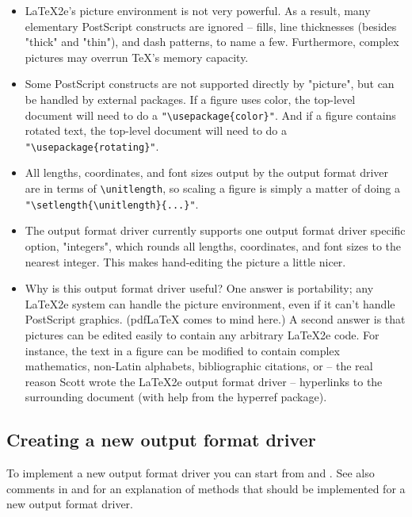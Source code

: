 \documentclass[english,a4paper]{article}
\begin{document}
    \begin{itemize}
   \item LaTeX2e's picture environment is not very powerful.  As a result, many
     elementary PostScript constructs are ignored -- fills, line
     thicknesses (besides "thick" and "thin"), and dash patterns, to name a
     few.  Furthermore, complex pictures may overrun TeX's memory capacity.

   \item Some PostScript constructs are not supported directly by "picture",
     but can be handled by external packages.  If a figure uses color, the
     top-level document will need to do a \verb+"\usepackage{color}"+.  And if a
     figure contains rotated text, the top-level document will need to do a
     \verb+"\usepackage{rotating}"+.

   \item All lengths, coordinates, and font sizes output by the output format driver are in
     terms of \verb+\unitlength+, so scaling a figure is simply a matter of doing
     a \verb+"\setlength{\unitlength}{...}"+.

   \item The output format driver currently supports one output format driver specific option,
     "integers", which rounds all lengths, coordinates, and font sizes to
     the nearest integer.  This makes hand-editing the picture a little
     nicer.

   \item Why is this output format driver useful?  One answer is portability; any LaTeX2e
     system can handle the picture environment, even if it can't handle
     PostScript graphics.  (pdfLaTeX comes to mind here.)  A second answer
     is that pictures can be edited easily to contain any arbitrary LaTeX2e
     code.  For instance, the text in a figure can be modified to contain
     complex mathematics, non-Latin alphabets, bibliographic citations, or
     -- the real reason Scott wrote the LaTeX2e output format driver -- hyperlinks to the
     surrounding document (with help from the hyperref package).
   \end{itemize}


  \subsection{Creating a new output format driver}

    To implement a new output format driver you can start from  and
    . See also comments in  and
     for an explanation of methods that should be implemented
    for a new output format driver.
\end{document}
